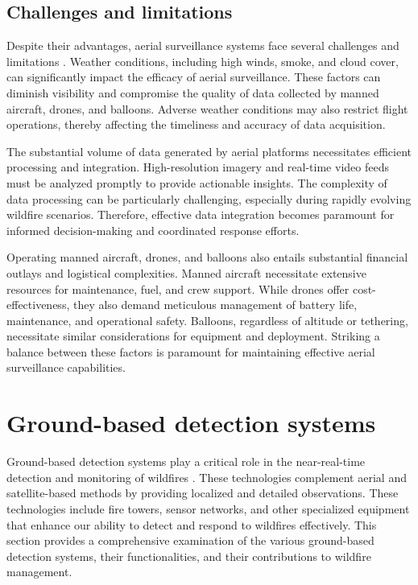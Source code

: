 \documentclass[
  12 pt,
]{Nemilov}
\begin{document}
\subsection{Challenges and limitations}\label{challenges-and-limitations-1}

Despite their advantages, aerial surveillance systems face several challenges and limitations \citep{allison2016airborne, mohapatra2022early}. Weather conditions, including high winds, smoke, and cloud cover, can significantly impact the efficacy of aerial surveillance. These factors can diminish visibility and compromise the quality of data collected by manned aircraft, drones, and balloons. Adverse weather conditions may also restrict flight operations, thereby affecting the timeliness and accuracy of data acquisition.

The substantial volume of data generated by aerial platforms necessitates efficient processing and integration. High-resolution imagery and real-time video feeds must be analyzed promptly to provide actionable insights. The complexity of data processing can be particularly challenging, especially during rapidly evolving wildfire scenarios. Therefore, effective data integration becomes paramount for informed decision-making and coordinated response efforts.

Operating manned aircraft, drones, and balloons also entails substantial financial outlays and logistical complexities. Manned aircraft necessitate extensive resources for maintenance, fuel, and crew support. While drones offer cost-effectiveness, they also demand meticulous management of battery life, maintenance, and operational safety. Balloons, regardless of altitude or tethering, necessitate similar considerations for equipment and deployment. Striking a balance between these factors is paramount for maintaining effective aerial surveillance capabilities.

\section{Ground-based detection systems}\label{ground-based-detection-systems}

Ground-based detection systems play a critical role in the near-real-time detection and monitoring of wildfires \citep{mohapatra2022early}. These technologies complement aerial and satellite-based methods by providing localized and detailed observations. These technologies include fire towers, sensor networks, and other specialized equipment that enhance our ability to detect and respond to wildfires effectively. This section provides a comprehensive examination of the various ground-based detection systems, their functionalities, and their contributions to wildfire management.
\end{document}
